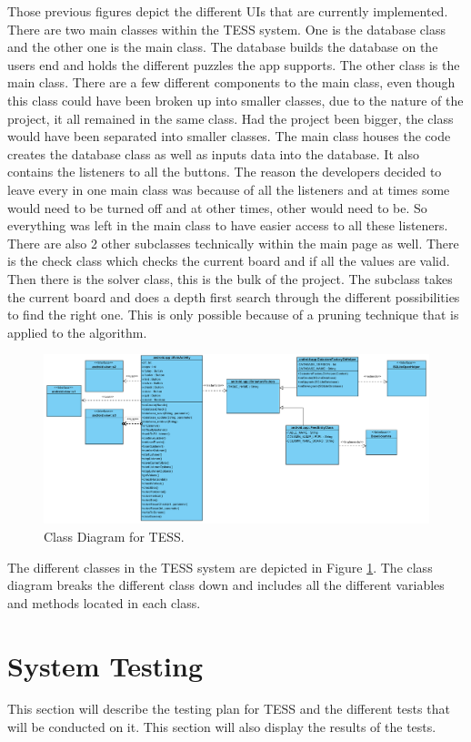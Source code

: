 \documentclass{article}
\begin{document}
Those previous figures depict the different UIs that are currently implemented. There are two main classes within the TESS system. One is the database class and the other one is the main class. The database builds the database on the users end and holds the different puzzles the app supports. The other class is the main class. There are a few different components to the main class, even though this class could have been broken up into smaller classes, due to the nature of the project, it all remained in the same class. Had the project been bigger, the class would have been separated into smaller classes. The main class houses the code creates the database class as well as inputs data into the database. It also contains the listeners to all the buttons. The reason the developers decided to leave every in one main class was because of all the listeners and at times some would need to be turned off and at other times, other would need to be. So everything was left in the main class to have easier access to all these listeners. There are also 2 other subclasses technically within the main page as well. There is the check class which checks the current board and if all the values are valid. Then there is the solver class, this is the bulk of the project. The subclass takes the current board and does a depth first search through the different possibilities to find the right one. This is only possible because of a pruning technique that is applied to the algorithm. 
\begin{figure}[h]
	\centering
	\includegraphics[width=5.0in]{./Figure/Class_Diagram.PNG}
	\caption{Class Diagram for TESS.}
	\label{fig:classdiagram}
\end{figure}

The different classes in the TESS system are depicted in Figure \ref{fig:classdiagram}. The class diagram breaks the different class down and includes all the different variables and methods located in each class.

\section{System Testing}
This section will describe the testing plan for TESS and the different tests that will be conducted on it. This section will also display the results of the tests.
\end{document}
